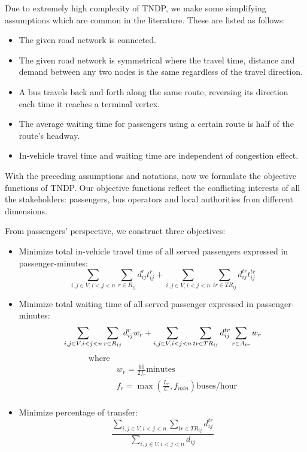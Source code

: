 Due to extremely high complexity of TNDP, we make some simplifying assumptions which are common in the literature. These are listed as follows:
\begin{itemize}
	\item The given road network is connected.
	\item The given road network is symmetrical where the travel time, distance and demand between any two nodes is the same regardless of the travel direction.
	\item A bus travels back and forth along the same route, reversing its direction each time it reaches a terminal vertex.
	\item The average waiting time for passengers using a certain route is half of the route's headway.
	\item In-vehicle travel time and waiting time are independent of congestion effect.
\end{itemize}

With the preceding assumptions and notations, now we formulate the objective functions of TNDP. Our objective functions reflect the conflicting interests of all the stakeholders: passengers, bus operators and local authorities from different dimensions.

From passengers' perspective, we construct three objectives:
\begin{itemize}
	\item Minimize total in-vehicle travel time of all served passengers expressed in passenger-minutes:
	\begin{equation}
	 \sum_{i,j \in V, i<j<n} \sum_{r \in R_{ij}} d_{ij}^r t_{ij}^r + \sum_{i,j \in V, i<j<n} \sum_{tr \in TR_{ij}} d_{ij}^{tr} t_{ij}^{tr}
	\end{equation}

	\item Minimize total waiting time of all served passenger expressed in passenger-minutes:
	\begin{equation}
	\sum_{i,j \in V, i<j<n} \sum_{r \in R_{ij}} d_{ij}^r w_r + \sum_{i,j \in V, i<j<n} \sum_{tr \in TR_{ij}} d_{ij}^{tr} \sum_{r \in A_{tr}} w_r \\
	\end{equation}
	\begin{align*}
	\text{where} &\\
				 &  w_r = \frac{60}{2f_r} \text{minutes}\\
				 &  f_r = \max \left(\frac{L_r}{C}, f_{min}
				 \right) \text{buses/hour}\\
	\end{align*}

	\item Minimize percentage of transfer:
	\begin{equation}
	\dfrac{\sum_{i,j \in V, i<j<n} \sum_{tr \in TR_{ij}} d_{ij}^{tr}}{\sum_{i,j \in V, i<j<n} d_{ij}}
	\end{equation}
	\end{itemize}

